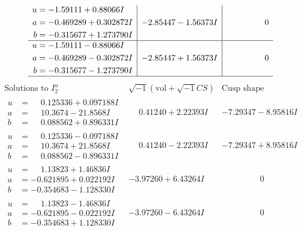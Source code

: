 \documentclass[1p]{elsarticle_modified}
\theoremstyle{definition}
\newcommand{\I}{\sqrt{-1}}
\begin{document}
$$\begin{array}{c|c|c}
\begin{aligned}
u &= -1.59111 + 0.88066 I \\
a &= -0.469289 + 0.302872 I \\
b &= -0.315677 + 1.273790 I\end{aligned}
 & -2.85447 - 1.56373 I & \phantom{-0.000000 } 0 \\ \hline\begin{aligned}
u &= -1.59111 - 0.88066 I \\
a &= -0.469289 - 0.302872 I \\
b &= -0.315677 - 1.273790 I\end{aligned}
 & -2.85447 + 1.56373 I & \phantom{-0.000000 } 0\\
 \hline 
 \end{array}$$\newpage$$\begin{array}{c|c|c}  
\text{Solutions to }I^u_{2}& \I (\text{vol} + \sqrt{-1}CS) & \text{Cusp shape}\\
 \hline 
\begin{aligned}
u &= \phantom{-}0.125336 + 0.097188 I \\
a &= \phantom{-}10.3674 - 21.8568 I \\
b &= \phantom{-}0.088562 + 0.896331 I\end{aligned}
 & \phantom{-}0.41240 + 2.22393 I & -7.29347 - 8.95816 I \\ \hline\begin{aligned}
u &= \phantom{-}0.125336 - 0.097188 I \\
a &= \phantom{-}10.3674 + 21.8568 I \\
b &= \phantom{-}0.088562 - 0.896331 I\end{aligned}
 & \phantom{-}0.41240 - 2.22393 I & -7.29347 + 8.95816 I \\ \hline\begin{aligned}
u &= \phantom{-}1.13823 + 1.46836 I \\
a &= -0.621895 + 0.022192 I \\
b &= -0.354683 - 1.128330 I\end{aligned}
 & -3.97260 + 6.43264 I & \phantom{-0.000000 } 0 \\ \hline\begin{aligned}
u &= \phantom{-}1.13823 - 1.46836 I \\
a &= -0.621895 - 0.022192 I \\
b &= -0.354683 + 1.128330 I\end{aligned}
 & -3.97260 - 6.43264 I & \phantom{-0.000000 } 0 \\ \hline\begin{aligned}

\end{aligned}
\end{array}$$
\end{document}
